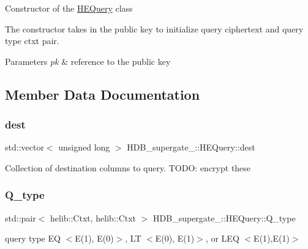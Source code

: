 Constructor of the \hyperlink{classHDB__supergate___1_1HEQuery}{H\+E\+Query} class

The constructor takes in the public key to initialize query ciphertext and query type ctxt pair. 
\begin{DoxyParams}{Parameters}
{\em pk} & reference to the public key \\
\hline
\end{DoxyParams}


\subsection{Member Data Documentation}
\mbox{\label{classHDB__supergate___1_1HEQuery_a1c1b7da0abf2fcee00f97e0b4d39c705}} 
\subsubsection{\texorpdfstring{dest}{dest}}
{\footnotesize\ttfamily std\+::vector$<$ unsigned long $>$ H\+D\+B\+\_\+supergate\+\_\+\+::\+H\+E\+Query\+::dest}

Collection of destination columns to query. T\+O\+DO\+: encrypt these \mbox{\label{classHDB__supergate___1_1HEQuery_a21c317527c7f5873d4ca2880c944611d}} 
\subsubsection{\texorpdfstring{Q\+\_\+type}{Q\_type}}
{\footnotesize\ttfamily std\+::pair$<$ helib\+::\+Ctxt, helib\+::\+Ctxt $>$ H\+D\+B\+\_\+supergate\+\_\+\+::\+H\+E\+Query\+::\+Q\+\_\+type}

query type EQ $<$E(1), E(0)$>$, LT $<$E(0), E(1)$>$, or L\+EQ $<$E(1),E(1)$>$ \mbox{\label{classHDB__supergate___1_1HEQuery_a4f6c52dc14ce033598e3ee9a7411fa75}} 
